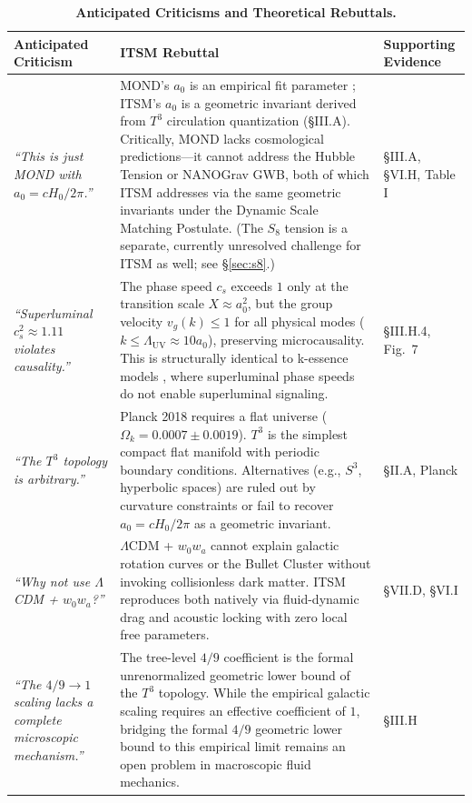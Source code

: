 \documentclass[aps,prd,10pt,twocolumn,superscriptaddress,nofootinbib,floatfix]{revtex4-2}
\begin{document}
\begin{table}[htbp]
\centering
\caption{\footnotesize \textbf{Anticipated Criticisms and Theoretical Rebuttals.}}
\label{tab:criticisms}
\renewcommand{\arraystretch}{1.3}
\scriptsize
\begin{tabular}{p{} p{} p{}}
\toprule
\textbf{Anticipated Criticism} & \textbf{ITSM Rebuttal} & \textbf{Supporting Evidence} \\
\midrule
\textit{``This is just MOND with $a_0 = c H_0 / 2\pi$.''} & MOND's $a_0$ is an empirical fit parameter \cite{mond}; ITSM's $a_0$ is a geometric invariant derived from $T^3$ circulation quantization (\S III.A). Critically, MOND lacks cosmological predictions---it cannot address the Hubble Tension or NANOGrav GWB, both of which ITSM addresses via the same geometric invariants under the Dynamic Scale Matching Postulate. (The $S_8$ tension is a separate, currently unresolved challenge for ITSM as well; see \S\ref{sec:s8}.) & \S III.A, \S VI.H, Table I \\
\textit{``Superluminal $c_s^2 \approx 1.11$ violates causality.''} & The phase speed $c_s$ exceeds $1$ only at the transition scale $X \approx a_0^2$, but the group velocity $v_g(k) \le 1$ for all physical modes ($k \le \Lambda_{\text{UV}} \approx 10a_0$), preserving microcausality. This is structurally identical to k-essence models \cite{babichev_cs2}, where superluminal phase speeds do not enable superluminal signaling. & \S III.H.4, Fig.~7 \\
\textit{``The $T^3$ topology is arbitrary.''} & Planck 2018 requires a flat universe ($\Omega_k = 0.0007 \pm 0.0019$). $T^3$ is the simplest compact flat manifold with periodic boundary conditions. Alternatives (e.g., $S^3$, hyperbolic spaces) are ruled out by curvature constraints or fail to recover $a_0 = c H_0 / 2\pi$ as a geometric invariant. & \S II.A, Planck \cite{planck} \\
\textit{``Why not use $\Lambda$CDM + $w_0 w_a$?''} & $\Lambda$CDM + $w_0 w_a$ cannot explain galactic rotation curves or the Bullet Cluster without invoking collisionless dark matter. ITSM reproduces both natively via fluid-dynamic drag and acoustic locking with zero local free parameters. & \S VII.D, \S VI.I \\
\textit{``The $4/9 \to 1$ scaling lacks a complete microscopic mechanism.''} & The tree-level $4/9$ coefficient is the formal unrenormalized geometric lower bound of the $T^3$ topology. While the empirical galactic scaling requires an effective coefficient of $1$, bridging the formal $4/9$ geometric lower bound to this empirical limit remains an open problem in macroscopic fluid mechanics. & \S III.H \\

\end{tabular}
\end{table}
\end{document}
